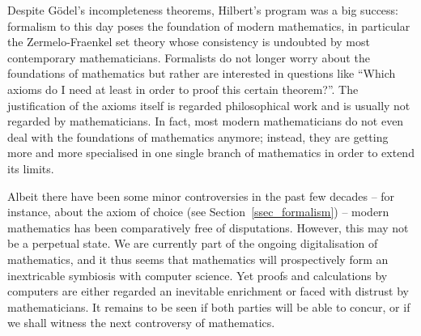 \documentclass{article}
\begin{document}
Despite Gödel's incompleteness theorems, Hilbert's program was a big success: formalism to this day poses the foundation of modern mathematics, in particular the Zermelo-Fraenkel set theory whose consistency is undoubted by most contemporary mathematicians.  
Formalists do not longer worry about the foundations of mathematics but rather are interested in questions like ``Which axioms do I need at least in order to proof this certain theorem?''. The justification of the axioms itself is regarded philosophical work and is usually not regarded by mathematicians. In fact, most modern mathematicians do not even deal with the foundations of mathematics anymore; instead, they are getting more and more specialised in one single branch of mathematics in order to extend its limits.

Albeit there have been some minor controversies in the past few decades -- for instance, about the axiom of choice (see Section~\ref{ssec_formalism}) -- modern mathematics has been comparatively free of disputations. However, this may not be a perpetual state. We are currently part of the ongoing digitalisation of mathematics, and it thus seems that mathematics will prospectively form an inextricable symbiosis with computer science. Yet proofs and calculations by computers are either regarded an inevitable enrichment or faced with distrust by mathematicians. It remains to be seen if both parties will be able to concur, or if we shall witness the next controversy of mathematics.

\newpage
{}


\end{document}
